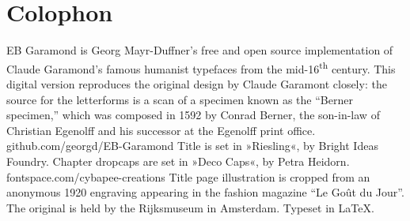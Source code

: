 \documentclass[
a5paper,
BCOR=7mm,
twoside,
DIV=calc,
11pt,
usegeometry,
chapterprefix,
headings=big]{scrbook} %
\begin{document}
\chapter*{Colophon}
\begin{center}
EB Garamond is Georg Mayr-Duffner's free and open source implementation of Claude Garamond’s famous humanist typefaces from the mid-16\textsuperscript{th} century. This digital version reproduces the original design by Claude Garamont closely: the source for the letterforms is a scan of a specimen known as the \enquote{Berner specimen,} which was composed in 1592 by Conrad Berner, the son-in-law of Christian Egenolff and his successor at the Egenolff print office.  \\github.com/georgd/EB-Garamond
\vfill
Title is set in »Riesling«, by Bright Ideas Foundry.
\vfill
Chapter dropcaps are set in »Deco Caps«, by Petra Heidorn.\\fontspace.com/cybapee-creations
\vfill
Title page illustration is cropped from an anonymous 1920 engraving appearing in the fashion magazine \foreignquote{french}{Le Goût du Jour}. The original is held by the Rijksmuseum in Amsterdam.
\vfill
Typeset in \LaTeX{}.
\end{center}
\thispagestyle{empty}
\end{document}
